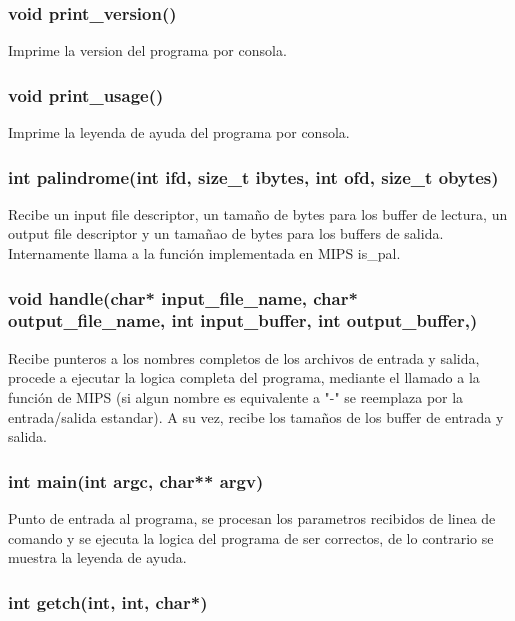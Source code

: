 \documentclass[10pt,a4paper]{article}
\begin{document}
\subsubsection{void print\_version()}

Imprime la version del programa por consola.

\subsubsection{void print\_usage()}

Imprime la leyenda de ayuda del programa por consola.

\subsubsection{int palindrome(int ifd, size\_t ibytes, int ofd, size\_t obytes)}

Recibe un input file descriptor, un tamaño de bytes para los buffer de lectura, un output file descriptor y un tamañao de bytes para los buffers de salida. Internamente llama a la función implementada en MIPS is\_pal.

\subsubsection{void handle(char* input\_file\_name, char* output\_file\_name, int input\_buffer, int output\_buffer,)}

Recibe punteros a los nombres completos de los archivos de entrada y salida, procede a ejecutar la logica completa del programa, mediante el llamado a la función de MIPS (si algun nombre es equivalente a "-" se reemplaza por la entrada/salida estandar). A su vez, recibe los tamaños de los buffer de entrada y salida.

\subsubsection{int main(int argc, char** argv)}

Punto de entrada al programa, se procesan los parametros recibidos de linea de comando y se ejecuta la logica del programa de ser correctos, de lo contrario se muestra la leyenda de ayuda.

\subsubsection{int getch(int, int, char*)}
\end{document}
